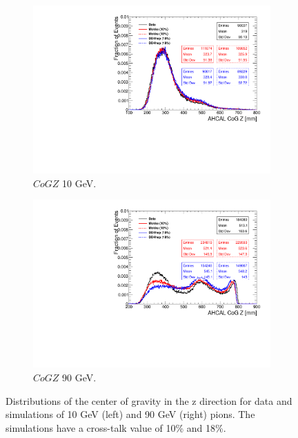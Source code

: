 \begin{figure}[htbp!]
  \centering
  \begin{subfigure}[t]{0.49\textwidth}
    \includegraphics[width=1.\linewidth]{chap5/fig_AHCAL_Timing/Pions/Comparison_CoGZ_Xtalk_pions10GeV.pdf}
    \caption{$CoGZ$ 10 GeV.} \label{fig:pi10CoGZ}
  \end{subfigure}
  \hfill
  \begin{subfigure}[t]{0.49\textwidth}
    \includegraphics[width=1.\linewidth]{chap5/fig_AHCAL_Timing/Pions/Comparison_CoGZ_Xtalk_pions90GeV.pdf}
    \caption{$CoGZ$ 90 GeV.} \label{fig:pi90CoGZ}
  \end{subfigure}
  \caption{Distributions of the center of gravity in the z direction for data and simulations of 10 GeV (left) and 90 GeV (right) pions. The simulations have a cross-talk value of 10\% and 18\%.}
  \label{fig:piGoGZ}
\end{figure}

